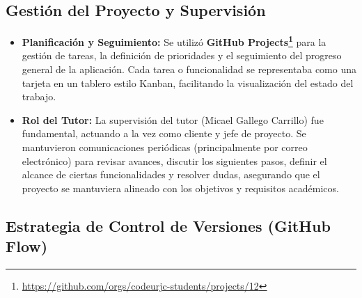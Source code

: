 \subsection{Gestión del Proyecto y Supervisión}
\label{sec:gestionProyectoSupervision}

    \begin{itemize}
        \item \textbf{Planificación y Seguimiento:} Se utilizó \textbf{GitHub Projects\footnote{\url{https://github.com/orgs/codeurjc-students/projects/12}}} para la gestión de tareas, la definición de prioridades y el seguimiento del progreso general de la aplicación. Cada tarea o funcionalidad se representaba como una tarjeta en un tablero estilo Kanban, facilitando la visualización del estado del trabajo.
        \item \textbf{Rol del Tutor:} La supervisión del tutor (Micael Gallego Carrillo) fue fundamental, actuando a la vez como cliente y jefe de proyecto. Se mantuvieron comunicaciones periódicas (principalmente por correo electrónico) para revisar avances, discutir los siguientes pasos, definir el alcance de ciertas funcionalidades y resolver dudas, asegurando que el proyecto se mantuviera alineado con los objetivos y requisitos académicos.
    \end{itemize}

\subsection{Estrategia de Control de Versiones (GitHub Flow)}
\label{sec:estrategiaGit}

